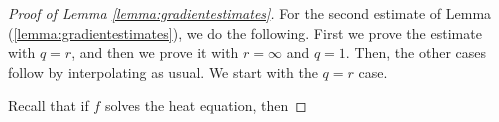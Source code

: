 \documentclass[12pt]{amsart}
\renewcommand{\1}{{\mathbf 1}}
\theoremstyle{others}
\numberwithin{equation}{section}
\begin{document}
\begin{proof}[Proof of Lemma \ref{lemma:gradientestimates}]

   \par 
   For the second estimate of Lemma (\ref{lemma:gradientestimates}), we do the following. First we prove the estimate with \(q = r\), and then we prove it with \(r = \infty\) and \(q = 1\). Then, the other cases follow by interpolating as usual. We start with the \(q = r\) case. \par Recall that if \(f\) solves the heat equation, then 

\end{proof}
\end{document}
